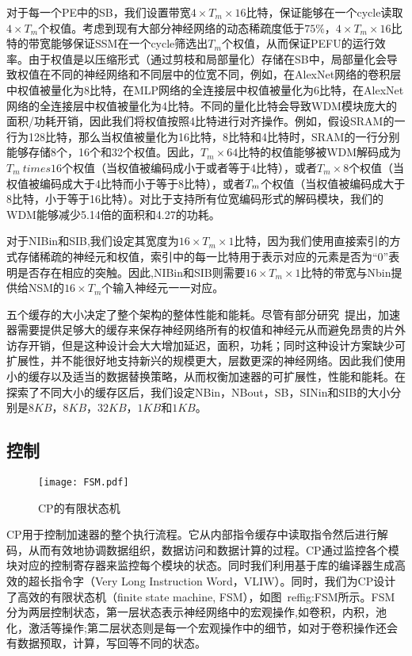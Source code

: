 对于每一个PE中的SB，我们设置带宽$4\times T_m\times 16$比特，保证能够在一个cycle读取$4\times T_m$个权值。考虑到现有大部分神经网络的动态稀疏度低于$75\%$，$4\times T_m \times 16$比特的带宽能够保证SSM在一个cycle筛选出$T_m$个权值，从而保证PEFU的运行效率。由于权值是以压缩形式（通过剪枝和局部量化）存储在SB中，局部量化会导致权值在不同的神经网络和不同层中的位宽不同，例如，在AlexNet网络的卷积层中权值被量化为8比特，在MLP网络的全连接层中权值被量化为6比特，在AlexNet网络的全连接层中权值被量化为4比特。不同的量化比特会导致WDM模块庞大的面积/功耗开销，因此我们将权值按照4比特进行对齐操作。例如，假设SRAM的一行为128比特，那么当权值被量化为16比特，8比特和4比特时，SRAM的一行分别能够存储8个，16个和32个权值。因此，$T_m \times 64$比特的权值能够被WDM解码成为$T_m \ times 16$个权值（当权值被编码成小于或者等于4比特），或者$T_m \times 8$个权值（当权值被编码成大于4比特而小于等于8比特），或者$T_m \time 4$个权值（当权值被编码成大于8比特，小于等于16比特）。对比于支持所有位宽编码形式的解码模块，我们的WDM能够减少5.14倍的面积和4.27的功耗。

对于NIBin和SIB,我们设定其宽度为$16\times T_m\times 1$比特，因为我们使用直接索引的方式存储稀疏的神经元和权值，索引中的每一比特用于表示对应的元素是否为“0”表明是否存在相应的突触。因此,NIBin和SIB则需要$16\times T_m\times 1$比特的带宽与Nbin提供给NSM的$16\times T_m$个输入神经元一一对应。

五个缓存的大小决定了整个架构的整体性能和能耗。尽管有部分研究~\cite{chen2014dadiannao,han2016eie}提出，加速器需要提供足够大的缓存来保存神经网络所有的权值和神经元从而避免昂贵的片外访存开销，但是这种设计会大大增加延迟，面积，功耗；同时这种设计方案缺少可扩展性，并不能很好地支持新兴的规模更大，层数更深的神经网络。因此我们使用小的缓存以及适当的数据替换策略，从而权衡加速器的可扩展性，性能和能耗。在探索了不同大小的缓存区后，我们设定NBin，NBout，SB，SINin和SIB的大小分别是$8KB$，$8KB$，$32KB$，$1KB$和$1KB$。

\subsection{控制}

\begin{figure}[h]
\centering
\texttt{[image: FSM.pdf]}
\caption{CP的有限状态机}
\label{fig:FSM}
\end{figure}

CP用于控制加速器的整个执行流程。它从内部指令缓存中读取指令然后进行解码，从而有效地协调数据组织，数据访问和数据计算的过程。CP通过监控各个模块对应的控制寄存器来监控每个模块的状态。同时我们利用基于库的编译器生成高效的超长指令字（Very Long Instruction Word，VLIW）。同时，我们为CP设计了高效的有限状态机（finite state machine, FSM），如图~ref{fig:FSM}所示。FSM分为两层控制状态，第一层状态表示神经网络中的宏观操作,如卷积，内积，池化，激活等操作;第二层状态则是每一个宏观操作中的细节，如对于卷积操作还会有数据预取，计算，写回等不同的状态。

